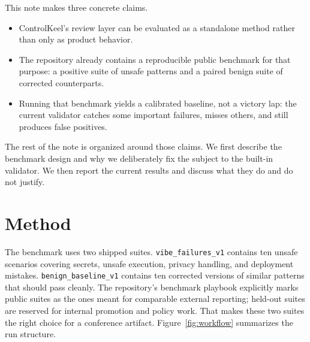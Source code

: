 \documentclass[10pt]{article}
\begin{document}
This note makes three concrete claims.
\begin{itemize}[leftmargin=1.25em]
\item ControlKeel's review layer can be evaluated as a standalone method rather than only as product behavior.
\item The repository already contains a reproducible public benchmark for that purpose: a positive suite of unsafe patterns and a paired benign suite of corrected counterparts.
\item Running that benchmark yields a calibrated baseline, not a victory lap: the current validator catches some important failures, misses others, and still produces false positives.
\end{itemize}

The rest of the note is organized around those claims. We first describe the benchmark design and why we deliberately fix the subject to the built-in validator. We then report the current results and discuss what they do and do not justify.

\section{Method}

The benchmark uses two shipped suites. \texttt{vibe\_failures\_v1} contains ten unsafe scenarios covering secrets, unsafe execution, privacy handling, and deployment mistakes. \texttt{benign\_baseline\_v1} contains ten corrected versions of similar patterns that should pass cleanly. The repository's benchmark playbook explicitly marks public suites as the ones meant for comparable external reporting; held-out suites are reserved for internal promotion and policy work. That makes these two suites the right choice for a conference artifact. Figure~\ref{fig:workflow} summarizes the run structure.
\end{document}
